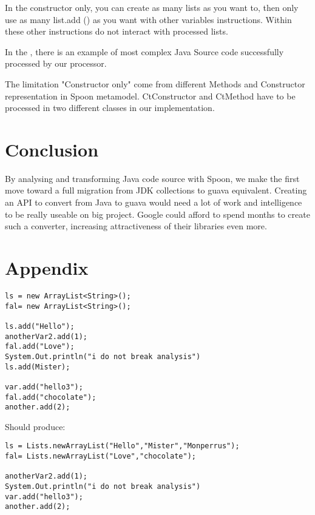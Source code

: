 \documentclass[paper=a4, fontsize=11pt]{scrartcl}
\numberwithin{equation}{section}%
\numberwithin{figure}{section}%
\numberwithin{table}{section}%
\begin{document}
In the constructor only, you can create as many lists as you want to,
then only use as many list.add () as you want with other variables
instructions. Within these other instructions do not interact with
processed lists.

In the , there is an example of most complex Java Source code
successfully processed by our processor.

The limitation "Constructor only" come from different Methods and
Constructor representation  in Spoon metamodel. CtConstructor and
CtMethod have to be processed in two different classes in our
implementation.

\section{Conclusion}

By analysing and transforming Java code source with Spoon, we make the
first move toward a full migration from JDK collections to guava
equivalent. Creating an API to convert from Java to guava would need a
lot of work and intelligence to be really useable on big
project. Google could afford to spend months to create such a
converter, increasing attractiveness of their libraries even more.  

\newpage
\appendix
\section{Appendix}
\label{app:one}
\begin{verbatim}
ls = new ArrayList<String>(); 
fal= new ArrayList<String>();

ls.add("Hello");
anotherVar2.add(1);
fal.add("Love");
System.Out.println("i do not break analysis")
ls.add(Mister);

var.add("hello3");
fal.add("chocolate");
another.add(2);
\end{verbatim}
Should produce:
\begin{verbatim}
ls = Lists.newArrayList("Hello","Mister","Monperrus"); 
fal= Lists.newArrayList("Love","chocolate");

anotherVar2.add(1);
System.Out.println("i do not break analysis")
var.add("hello3");
another.add(2);
\end{verbatim}
\end{document}
